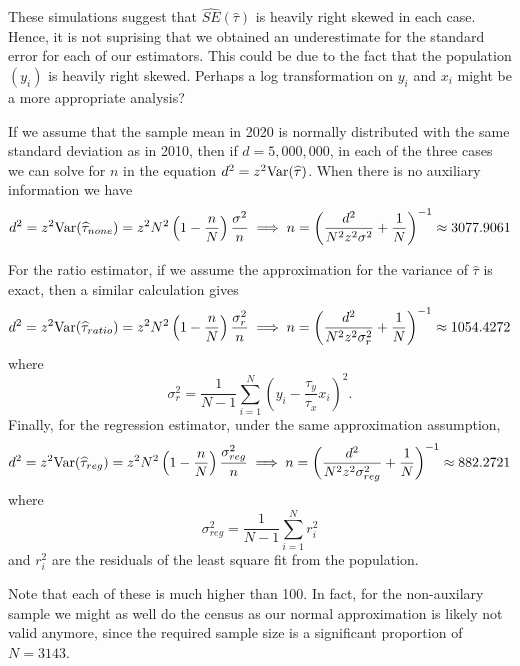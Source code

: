 \documentclass{homework}
\begin{document}
\begin{solution}
These simulations suggest that $\hat{SE}(\hat \tau)$ is heavily right skewed in each case.  Hence, it is not suprising that we obtained an underestimate for the standard error for each of our estimators.
This could be due to the fact that the population $(y_i)$ is heavily right skewed.  Perhaps a log transformation on $y_i$ and $x_i$ might be a more appropriate analysis?
\end{solution}

\begin{solution}
  If we assume that the sample mean in 2020 is normally distributed with the same standard deviation as in 2010, then if $d = 5,000,000$, in each of the three cases we can solve for $n$ in the equation $ d^2 = z^2\mathrm{Var}(\widehat{\tau}) $.  When there is no auxiliary information we have
  $$
    d^2 = z^2 \mathrm{Var}(\widehat\tau_{none})= z^2N^2\left(1 - \frac nN\right) \frac{\sigma^2}{n} \implies n = \left(\frac{d^2}{N^2z^2\sigma^2} + \frac 1N\right)^{-1} \approx 3077.9061 
  $$

  For the ratio estimator, if we assume the approximation for the variance of $\hat\tau$ is exact, then a similar calculation gives
  $$
    d^2 = z^2 \mathrm{Var}(\widehat\tau_{ratio})= z^2N^2\left(1 - \frac nN\right) \frac{\sigma_r^2}{n} \implies n = \left(\frac{d^2}{N^2z^2\sigma_r^2} + \frac 1N\right)^{-1} \approx 1054.4272 
  $$
  where
  $$
    \sigma_r^2 = \frac1{N-1}\sum_{i=1}^N\left(y_i - \frac{\tau_y}{\tau_x}x_i\right)^2.
  $$
  Finally, for the regression estimator, under the same approximation assumption,
  $$
    d^2 = z^2 \mathrm{Var}(\widehat\tau_{reg})= z^2N^2\left(1 - \frac nN\right) \frac{\sigma_{reg}^2}{n} \implies n = \left(\frac{d^2}{N^2z^2\sigma_{reg}^2} + \frac 1N\right)^{-1} \approx 882.2721 
  $$
  where
  $$
    \sigma_{reg}^2 = \frac{1}{N-1}\sum_{i=1}^Nr_i^2
  $$
  and $r_i^2$ are the residuals of the least square fit from the population.

  Note that each of these is much higher than 100.  In fact, for the non-auxilary sample we might as well do the census as our normal approximation is likely not valid anymore, since the required sample size is a significant proportion of $N=3143$.

\end{solution}
\end{document}
